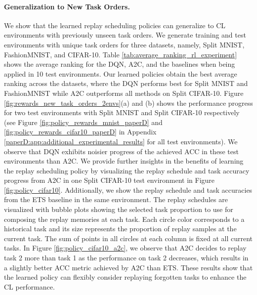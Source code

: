 \paragraph{Generalization to New Task Orders.} 
We show that the learned replay scheduling policies can generalize to CL environments with previously unseen task orders. We generate training and test environments with unique task orders for three datasets, namely, Split MNIST, FashionMNIST, and CIFAR-10. Table \ref{tab:average_ranking_rl_experiment} shows the average ranking for the DQN, A2C, and the baselines when being applied in 10 test environments. 
Our learned policies obtain the best average ranking across the datasets, where the DQN performs best for Split MNIST and FashionMNIST while A2C outperforms all methods on Split CIFAR-10. Figure \ref{fig:rewards_new_task_orders_2envs}(a) and (b) shows the performance progress for two test environments with Split MNIST and Split CIFAR-10 respectively (see Figure \ref{fig:policy_rewards_mnist_paperD} and \ref{fig:policy_rewards_cifar10_paperD} in Appendix \ref{paperD:app:additional_experimental_results} for all test environments). We observe that DQN exhibits noisier progress of the achieved ACC in these test environments than A2C. 
We provide further insights in the benefits of learning the replay scheduling policy by visualizing the replay schedule and task accuracy progress from A2C in one Split CIFAR-10 test environment in Figure \ref{fig:policy_cifar10}. Additionally, we show the replay schedule and task accuracies from the ETS baseline in the same environment. The replay schedules are visualized with bubble plots showing the selected task proportion to use for composing the replay memories at each task. Each circle color corresponds to a historical task and its size represents the proportion of replay samples at the current task. The sum of points in all circles at each column is fixed at all current tasks. In Figure \ref{fig:policy_cifar10_a2c}, we observe that A2C decides to replay task 2 more than task 1 as the performance on task 2 decreases, which results in a slightly better ACC metric achieved by A2C than ETS. These results show that the learned policy can flexibly consider replaying forgotten tasks to enhance the CL performance.

